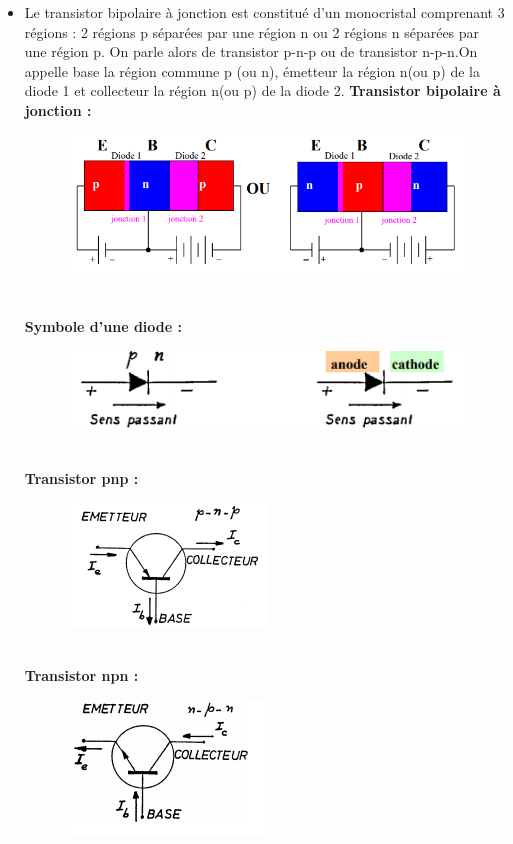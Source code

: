 \documentclass{report}
\begin{document}
\begin{itemize}
\item Le transistor bipolaire à jonction est constitué d'un monocristal comprenant 3 régions : 2 régions p séparées par une région n ou 2 régions n séparées par une région p. On parle alors de transistor p-n-p ou de transistor n-p-n.On appelle base la région commune p (ou n), émetteur la région n(ou p) de la diode 1 et collecteur la région n(ou p) de la diode 2.
\newpage
\textbf{Transistor bipolaire à jonction : }
\begin{figure}[h!]
\centering
\includegraphics[scale=0.5]{Trans.png}
\end{figure}
\\
\textbf{Symbole d'une diode : }
\begin{figure}[h!]
\centering
\includegraphics[scale=0.5]{Diode.png}
\end{figure}
\\
\textbf{Transistor pnp : }
\begin{figure}[h!]
\centering
\includegraphics[scale=1]{pnp.png}
\end{figure}
\\
\textbf{Transistor npn : }
\begin{figure}[h!]
\centering
\includegraphics[scale=1]{npn.png}
\end{figure}

\end{itemize}
\end{document}
